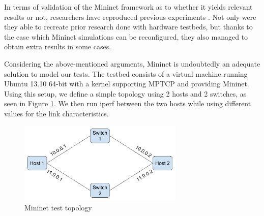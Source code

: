 In terms of validation of the Mininet framework as to whether it yields
relevant results or not, researchers have reproduced previous experiments
\cite{mininet-reproduce}. Not only were they able to recreate prior research
done with hardware testbeds, but thanks to the ease which Mininet simulations
can be reconfigured, they also managed to obtain extra results in some cases.

Considering the above-mentioned arguments, Mininet is undoubtedly an adequate
solution to model our tests. The testbed consists of a virtual machine running
Ubuntu 13.10 64-bit with a kernel supporting MPTCP and providing Mininet.
Using this setup, we define a simple topology using 2 hosts and 2 switches, as
seen in Figure \ref{fig:mininet-topo}. We then run iperf between the two hosts
while using different values for the link characteristics.

\begin{figure}
  \centering
  \includegraphics[width=0.7\textwidth]{img/mininet-topo}
  \caption{Mininet test topology}
  \label{fig:mininet-topo}
\end{figure}

